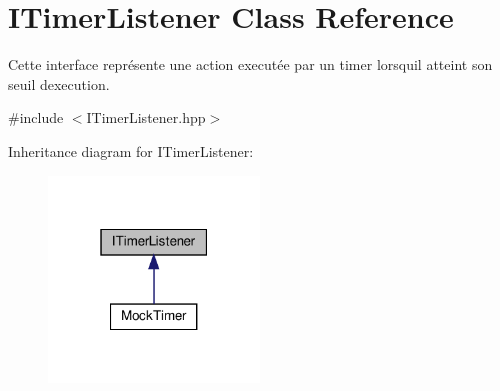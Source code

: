 \hypertarget{classITimerListener}{}\section{I\+Timer\+Listener Class Reference}
\label{classITimerListener}


Cette interface représente une action executée par un timer lorsqu\textquotesingle{}il atteint son seuil d\textquotesingle{}execution.  




{\ttfamily \#include $<$I\+Timer\+Listener.\+hpp$>$}



Inheritance diagram for I\+Timer\+Listener\+:
\nopagebreak
\begin{figure}[H]
\begin{center}
\leavevmode
\includegraphics[width=159pt]{classITimerListener__inherit__graph}
\end{center}
\end{figure}
